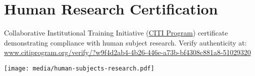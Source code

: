 \setlength{\headwidth}{\textwidth}
{
\setlength{\parindent}{0pt}
\section{Human Research Certification}\label{sec:compliance}
Collaborative Institutional Training Initiative (\href{https://about.citiprogram.org/}{CITI Program}) certificate demonstrating compliance with human subject research. Verify authenticity at: \url{www.citiprogram.org/verify/?w9f4d2ab4-4b26-446e-a73b-bf4308c881a8-51029320}

\texttt{[image: media/human-subjects-research.pdf]}
}